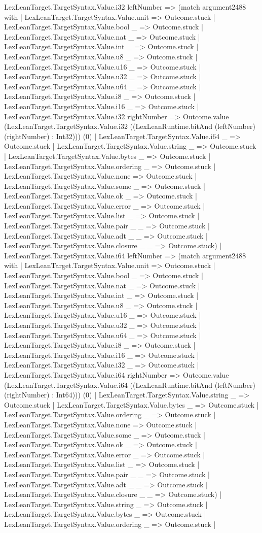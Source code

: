 \documentclass[11pt]{article}
\begin{document}
LexLeanTarget.TargetSyntax.Value.i32 leftNumber => (match argument2488 with | LexLeanTarget.TargetSyntax.Value.unit => Outcome.stuck | LexLeanTarget.TargetSyntax.Value.bool \_ => Outcome.stuck | LexLeanTarget.TargetSyntax.Value.nat \_ => Outcome.stuck | LexLeanTarget.TargetSyntax.Value.int \_ => Outcome.stuck | LexLeanTarget.TargetSyntax.Value.u8 \_ => Outcome.stuck | LexLeanTarget.TargetSyntax.Value.u16 \_ => Outcome.stuck | LexLeanTarget.TargetSyntax.Value.u32 \_ => Outcome.stuck | LexLeanTarget.TargetSyntax.Value.u64 \_ => Outcome.stuck | LexLeanTarget.TargetSyntax.Value.i8 \_ => Outcome.stuck | LexLeanTarget.TargetSyntax.Value.i16 \_ => Outcome.stuck | LexLeanTarget.TargetSyntax.Value.i32 rightNumber => Outcome.value (LexLeanTarget.TargetSyntax.Value.i32 ((LexLeanRuntime.bitAnd (leftNumber) (rightNumber) : Int32))) (0) | LexLeanTarget.TargetSyntax.Value.i64 \_ => Outcome.stuck | LexLeanTarget.TargetSyntax.Value.string \_ => Outcome.stuck | LexLeanTarget.TargetSyntax.Value.bytes \_ => Outcome.stuck | LexLeanTarget.TargetSyntax.Value.ordering \_ => Outcome.stuck | LexLeanTarget.TargetSyntax.Value.none => Outcome.stuck | LexLeanTarget.TargetSyntax.Value.some \_ => Outcome.stuck | LexLeanTarget.TargetSyntax.Value.ok \_ => Outcome.stuck | LexLeanTarget.TargetSyntax.Value.error \_ => Outcome.stuck | LexLeanTarget.TargetSyntax.Value.list \_ => Outcome.stuck | LexLeanTarget.TargetSyntax.Value.pair \_ \_ => Outcome.stuck | LexLeanTarget.TargetSyntax.Value.adt \_ \_ => Outcome.stuck | LexLeanTarget.TargetSyntax.Value.closure \_ \_ => Outcome.stuck) | LexLeanTarget.TargetSyntax.Value.i64 leftNumber => (match argument2488 with | LexLeanTarget.TargetSyntax.Value.unit => Outcome.stuck | LexLeanTarget.TargetSyntax.Value.bool \_ => Outcome.stuck | LexLeanTarget.TargetSyntax.Value.nat \_ => Outcome.stuck | LexLeanTarget.TargetSyntax.Value.int \_ => Outcome.stuck | LexLeanTarget.TargetSyntax.Value.u8 \_ => Outcome.stuck | LexLeanTarget.TargetSyntax.Value.u16 \_ => Outcome.stuck | LexLeanTarget.TargetSyntax.Value.u32 \_ => Outcome.stuck | LexLeanTarget.TargetSyntax.Value.u64 \_ => Outcome.stuck | LexLeanTarget.TargetSyntax.Value.i8 \_ => Outcome.stuck | LexLeanTarget.TargetSyntax.Value.i16 \_ => Outcome.stuck | LexLeanTarget.TargetSyntax.Value.i32 \_ => Outcome.stuck | LexLeanTarget.TargetSyntax.Value.i64 rightNumber => Outcome.value (LexLeanTarget.TargetSyntax.Value.i64 ((LexLeanRuntime.bitAnd (leftNumber) (rightNumber) : Int64))) (0) | LexLeanTarget.TargetSyntax.Value.string \_ => Outcome.stuck | LexLeanTarget.TargetSyntax.Value.bytes \_ => Outcome.stuck | LexLeanTarget.TargetSyntax.Value.ordering \_ => Outcome.stuck | LexLeanTarget.TargetSyntax.Value.none => Outcome.stuck | LexLeanTarget.TargetSyntax.Value.some \_ => Outcome.stuck | LexLeanTarget.TargetSyntax.Value.ok \_ => Outcome.stuck | LexLeanTarget.TargetSyntax.Value.error \_ => Outcome.stuck | LexLeanTarget.TargetSyntax.Value.list \_ => Outcome.stuck | LexLeanTarget.TargetSyntax.Value.pair \_ \_ => Outcome.stuck | LexLeanTarget.TargetSyntax.Value.adt \_ \_ => Outcome.stuck | LexLeanTarget.TargetSyntax.Value.closure \_ \_ => Outcome.stuck) | LexLeanTarget.TargetSyntax.Value.string \_ => Outcome.stuck | LexLeanTarget.TargetSyntax.Value.bytes \_ => Outcome.stuck | LexLeanTarget.TargetSyntax.Value.ordering \_ => Outcome.stuck | 
\end{document}
